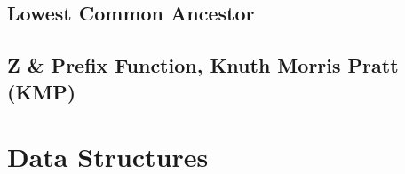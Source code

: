 \documentclass[12pt]{extarticle}
\begin{document}
\begin{multicols*}{2}
\subsection{Lowest Common Ancestor} 


% 


% 

% 

% 

% 

\subsection{Z \& Prefix Function, Knuth Morris Pratt (KMP)} %


\section{Data Structures}

% 


\end{multicols*}
\end{document}
